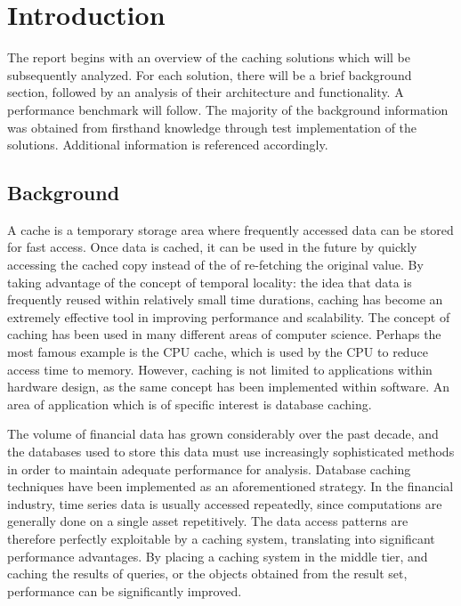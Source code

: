 \documentclass[ece]{uw-wkrpt}
\begin{document}
\tableofcontents
\listoffigures
\listoftables

\mainmatter

\section{Introduction}
The report begins with an overview of the caching solutions which will be subsequently analyzed. For each solution, there will be a brief background section, followed by an analysis of their architecture and functionality. A performance benchmark will follow. The majority of the background information was obtained from firsthand knowledge through test implementation of the solutions. Additional information is referenced accordingly. 


\subsection{Background}
A cache is a temporary storage area where frequently accessed data can be stored for fast access. Once data is cached, it can be used in the future by quickly accessing the cached copy instead of the of re-fetching the original value. By taking advantage of the concept of temporal locality: the idea that data is frequently reused within relatively small time durations, caching has become an extremely effective tool in improving performance and scalability. The concept of caching has been used in many different areas of computer science. Perhaps the most  famous example is the CPU cache, which is used by the CPU to reduce access time to memory. However, caching is not limited to applications within hardware design, as the same concept has been implemented within software. An area of application which is of specific interest is database caching. 

The volume of financial data has grown considerably over the past decade, and the databases used to store this data must use increasingly sophisticated methods in order to maintain adequate performance for analysis. 
Database caching techniques have been implemented as an aforementioned strategy. In the financial industry, time series data is usually accessed repeatedly, since computations are generally done on a single asset repetitively. The data access patterns are therefore perfectly exploitable by a caching system, translating into significant performance advantages. By placing a caching system in the middle tier, and caching the results of queries, or the objects obtained from the result set, performance can be significantly improved. 
\end{document}
